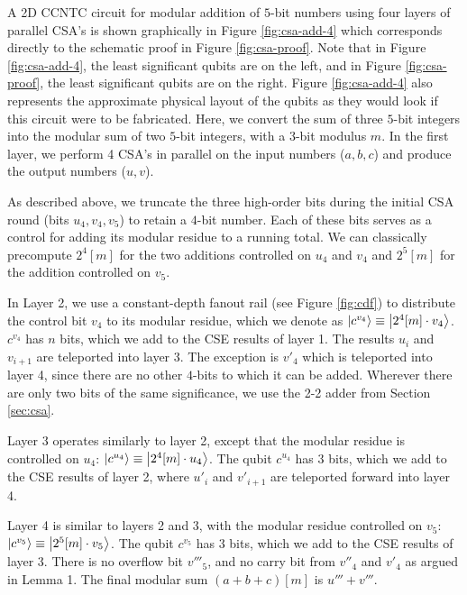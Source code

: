 \documentclass[twoside]{article}
\begin{document}
A \textsc{2D CCNTC} circuit for modular addition of $5$-bit numbers using
four layers of parallel CSA's is shown graphically in Figure \ref{fig:csa-add-4}
which corresponds directly to the schematic proof in Figure \ref{fig:csa-proof}.
Note that in Figure \ref{fig:csa-add-4}, the least significant qubits are
on the left, and in Figure \ref{fig:csa-proof}, the least significant qubits are
on the right.
Figure \ref{fig:csa-add-4} also represents the approximate
physical layout of the qubits as they would look if this
circuit were to be fabricated.
Here, we convert the sum of three
$5$-bit integers into the modular sum of two $5$-bit integers, with a
$3$-bit modulus $m$.
In the first layer,
we perform 4 CSA's in parallel on the input numbers ($a,b,c$) and produce the
output numbers ($u, v$).

As described above, we truncate
the three high-order bits during the initial CSA round
(bits $u_4, v_4, v_5$) to retain a $4$-bit number.
Each of these bits serves as a control for adding its modular residue to
a running total. We can classically precompute $2^4[m]$ for the two
additions controlled on $u_4$ and $v_4$ and
$2^5[m]$ for the addition controlled on $v_5$.

In Layer 2,
we use a constant-depth fanout rail (see Figure \ref{fig:cdf}) to
distribute the control bit $v_4$ to its modular residue, which we denote as
$\left\vert{c^{v_4}}\right\rangle \equiv \left\vert{2^4[m]\cdot v_4}\right\rangle$.
$c^{v_4}$ has $n$ bits, which we add to the CSE results of layer 1.
The results $u_i$ and $v_{i+1}$ are teleported into layer 3. The exception is
$v'_4$ which is teleported into layer 4, since there are no other $4$-bits
to which it can be added. Wherever there are only
two bits of the same significance, we use the 2-2 adder from
Section \ref{sec:csa}.

Layer 3
operates similarly to layer 2, except that the modular residue is controlled on
$u_4$:
$\left\vert{c^{u_4}}\right\rangle \equiv \left\vert{2^4[m] \cdot u_4}\right\rangle$.
The qubit $c^{u_4}$ has $3$ bits, which we
add to the CSE results of layer 2, where $u'_i$ and $v'_{i+1}$ are teleported
forward into layer 4.

Layer 4
is similar to layers 2 and 3, with the modular residue controlled on $v_5$:
$\left\vert{c^{v_5}}\right\rangle \equiv \left\vert{2^5[m] \cdot v_5}\right\rangle$.
The qubit $c^{v_5}$ has $3$ bits, which we
add to the CSE results of layer 3.
There is no overflow bit $v'''_5$, and no carry bit from $v''_4$ and $v'_4$
as argued in Lemma 1.
The final modular sum $(a+b+c)[m]$ is $u'''+v'''$.
\end{document}
